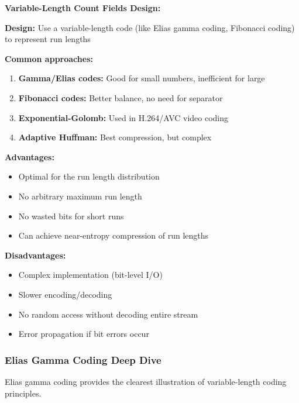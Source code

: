 \begin{importantbox}
\textbf{Variable-Length Count Fields Design:}

\textbf{Design:} Use a variable-length code (like Elias gamma coding, Fibonacci coding) to represent run lengths

\textbf{Common approaches:}
\begin{enumerate}
    \item \textbf{Gamma/Elias codes:} Good for small numbers, inefficient for large
    \item \textbf{Fibonacci codes:} Better balance, no need for separator
    \item \textbf{Exponential-Golomb:} Used in H.264/AVC video coding
    \item \textbf{Adaptive Huffman:} Best compression, but complex
\end{enumerate}

\textbf{Advantages:}
\begin{itemize}
    \item Optimal for the run length distribution
    \item No arbitrary maximum run length
    \item No wasted bits for short runs
    \item Can achieve near-entropy compression of run lengths
\end{itemize}

\textbf{Disadvantages:}
\begin{itemize}
    \item Complex implementation (bit-level I/O)
    \item Slower encoding/decoding
    \item No random access without decoding entire stream
    \item Error propagation if bit errors occur
\end{itemize}
\end{importantbox}

\subsubsection*{Elias Gamma Coding Deep Dive}

Elias gamma coding provides the clearest illustration of variable-length coding principles.

